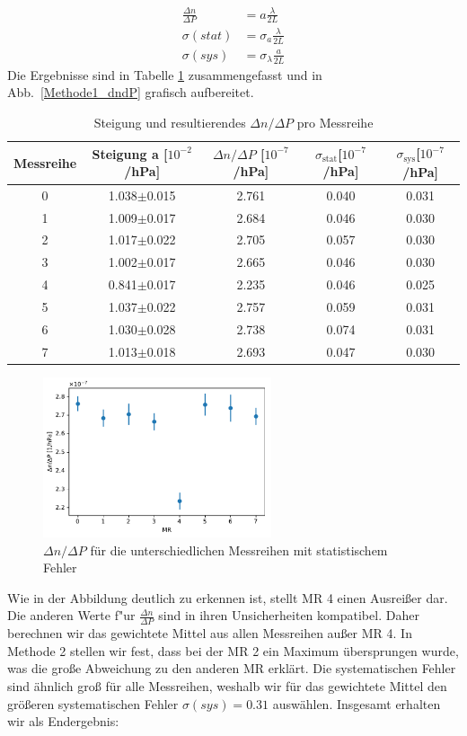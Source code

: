 \documentclass[12pt,a4paper]{article}
\begin{document}
\begin{align}\label{eq:dndp_aus_Steigung}
\frac{\Delta n}{\Delta P}&=a\frac{\lambda}{2L}\nonumber\\
\sigma(stat)&=\sigma_{a}\frac{\lambda}{2L}\nonumber\\
\sigma(sys)&=\sigma_{\lambda}\frac{a}{2L}
\end{align}
Die Ergebnisse sind in Tabelle \ref{table:Methode1_dndP} zusammengefasst und in Abb.~\eqref{Methode1_dndP} grafisch aufbereitet.
\begin{table}[H]
	\centering
	\begin{tabular}{|c|c|c|c|c|}
		\hline
		Messreihe&Steigung a [$10^{-2}$/hPa]&$\Delta n/\Delta P$ [$10^{-7}$/hPa]&$\sigma_{\text{stat}}$[$10^{-7}$/hPa]&$\sigma_{\text{sys}}$[$10^{-7}$/hPa]\\
		\hline
		0&1.038$\pm$0.015&2.761&0.040&0.031\\
		1&1.009$\pm$0.017&2.684&0.046&0.030\\
		2&1.017$\pm$0.022&2.705&0.057&0.030\\
		3&1.002$\pm$0.017&2.665&0.046&0.030\\
		4&0.841$\pm$0.017&2.235&0.046&0.025\\
		5&1.037$\pm$0.022&2.757&0.059&0.031\\
		6&1.030$\pm$0.028&2.738&0.074&0.031\\
		7&1.013$\pm$0.018&2.693&0.047&0.030\\
		\hline
	\end{tabular}
	\caption{Steigung und resultierendes $\Delta n/\Delta P$ pro Messreihe}
	\label{table:Methode1_dndP}
\end{table}
\begin{figure}[H]
	\centering
	\includegraphics[width=0.6\textwidth]{Python/Methode1_Ergebnisse.pdf}
	\caption{$\Delta n/\Delta P$ für die unterschiedlichen Messreihen mit statistischem Fehler}
	\label{Methode1_dndP}
\end{figure}
Wie in der Abbildung deutlich zu erkennen ist, stellt MR 4 einen Ausreißer dar. Die anderen Werte f"ur $\frac{\Delta n}{\Delta P}$ sind in ihren Unsicherheiten kompatibel. Daher berechnen wir das gewichtete Mittel aus allen Messreihen außer MR 4. In Methode 2 stellen wir fest, dass bei der MR 2 ein Maximum übersprungen wurde, was die große Abweichung zu den anderen MR erklärt. Die systematischen Fehler sind ähnlich groß für alle Messreihen, weshalb wir für das gewichtete Mittel den größeren systematischen Fehler $\sigma(sys)=0.31$ auswählen. Insgesamt erhalten wir als Endergebnis:  
\end{document}
